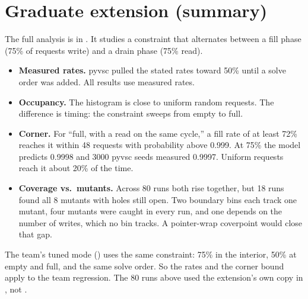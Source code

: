 \section{Graduate extension (summary)}
\label{sec:ext}

The full analysis is in . It studies
a constraint that alternates between a fill phase (75\% of requests write) and
a drain phase (75\% read).

\begin{itemize}
\item \textbf{Measured rates.} pyvsc pulled the stated rates toward 50\% until
a solve order was added. All results use measured rates.
\item \textbf{Occupancy.} The histogram is close to uniform random requests.
The difference is timing: the constraint sweeps from empty to full.
\item \textbf{Corner.} For ``full, with a read on the same cycle,'' a fill
rate of at least 72\% reaches it within 48 requests with probability above
0.999. At 75\% the model predicts 0.9998 and 3000 pyvsc seeds measured 0.9997.
Uniform requests reach it about 20\% of the time.
\item \textbf{Coverage vs.\ mutants.} Across 80 runs both rise together, but
18 runs found all 8 mutants with holes still open. Two boundary bins each
track one mutant, four mutants were caught in every run, and one depends on
the number of writes, which no bin tracks. A pointer-wrap coverpoint would
close that gap.
\end{itemize}

The team's tuned mode () uses the same constraint: 75\%
in the interior, 50\% at empty and full, and the same solve order. So the
rates and the corner bound apply to the team regression. The 80 runs above
used the extension's own copy in , not .
